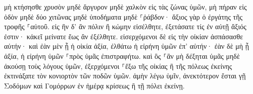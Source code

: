 \documentclass{openreader}
\begin{document}
μὴ κτήσησθε χρυσὸν μηδὲ ἄργυρον μηδὲ χαλκὸν εἰς τὰς ζώνας ὑμῶν, 
μὴ πήραν εἰς ὁδὸν μηδὲ δύο χιτῶνας μηδὲ ὑποδήματα μηδὲ ⸀ῥάβδον· ἄξιος γὰρ ὁ ἐργάτης τῆς τροφῆς ⸀αὐτοῦ. 
εἰς ἣν δ’ ἂν πόλιν ἢ κώμην εἰσέλθητε, ἐξετάσατε τίς ἐν αὐτῇ ἄξιός ἐστιν· κἀκεῖ μείνατε ἕως ἂν ἐξέλθητε. 
εἰσερχόμενοι δὲ εἰς τὴν οἰκίαν ἀσπάσασθε αὐτήν· 
καὶ ἐὰν μὲν ᾖ ἡ οἰκία ἀξία, ἐλθάτω ἡ εἰρήνη ὑμῶν ἐπ’ αὐτήν· ἐὰν δὲ μὴ ᾖ ἀξία, ἡ εἰρήνη ὑμῶν ⸀πρὸς ὑμᾶς ἐπιστραφήτω. 
καὶ ὃς ⸀ἂν μὴ δέξηται ὑμᾶς μηδὲ ἀκούσῃ τοὺς λόγους ὑμῶν, ἐξερχόμενοι ⸀ἔξω τῆς οἰκίας ἢ τῆς πόλεως ἐκείνης ἐκτινάξατε τὸν κονιορτὸν τῶν ποδῶν ὑμῶν. 
ἀμὴν λέγω ὑμῖν, ἀνεκτότερον ἔσται γῇ Σοδόμων καὶ Γομόρρων ἐν ἡμέρᾳ κρίσεως ἢ τῇ πόλει ἐκείνῃ. 
\end{document}
